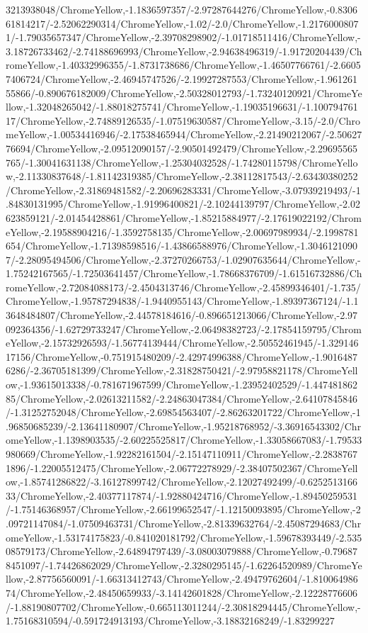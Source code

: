 {\begin{tikzternal}
3213938048/ChromeYellow,-1.1836597357/-2.97287644276/ChromeYellow,-0.830661814217/-2.52062290314/ChromeYellow,-1.02/-2.0/ChromeYellow,-1.21760008071/-1.79035657347/ChromeYellow,-2.39708298902/-1.01718511416/ChromeYellow,-3.18726733462/-2.74188696993/ChromeYellow,-2.94638496319/-1.91720204439/ChromeYellow,-1.40332996355/-1.8731738686/ChromeYellow,-1.46507766761/-2.66057406724/ChromeYellow,-2.46945747526/-2.19927287553/ChromeYellow,-1.96126155866/-0.890676182009/ChromeYellow,-2.50328012793/-1.73240120921/ChromeYellow,-1.32048265042/-1.88018275741/ChromeYellow,-1.19035196631/-1.10079476117/ChromeYellow,-2.74889126535/-1.07519630587/ChromeYellow,-3.15/-2.0/ChromeYellow,-1.00534416946/-2.17538465944/ChromeYellow,-2.21490212067/-2.5062776694/ChromeYellow,-2.09512090157/-2.90501492479/ChromeYellow,-2.29695565765/-1.30041631138/ChromeYellow,-1.25304032528/-1.74280115798/ChromeYellow,-2.11330837648/-1.81142319385/ChromeYellow,-2.38112817543/-2.63430380252/ChromeYellow,-2.31869481582/-2.20696283331/ChromeYellow,-3.07939219493/-1.84830131995/ChromeYellow,-1.91996400821/-2.10244139797/ChromeYellow,-2.02623859121/-2.01454428861/ChromeYellow,-1.85215884977/-2.17619022192/ChromeYellow,-2.19588904216/-1.3592758135/ChromeYellow,-2.00697989934/-2.1998781654/ChromeYellow,-1.71398598516/-1.43866588976/ChromeYellow,-1.30461210907/-2.28095494506/ChromeYellow,-2.37270266753/-1.02907635644/ChromeYellow,-1.75242167565/-1.72503641457/ChromeYellow,-1.78668376709/-1.61516732886/ChromeYellow,-2.72084088173/-2.4504313746/ChromeYellow,-2.45899346401/-1.735/ChromeYellow,-1.95787294838/-1.9440955143/ChromeYellow,-1.89397367124/-1.13648484807/ChromeYellow,-2.44578184616/-0.896651213066/ChromeYellow,-2.97092364356/-1.62729733247/ChromeYellow,-2.06498382723/-2.17854159795/ChromeYellow,-2.15732926593/-1.56774139444/ChromeYellow,-2.50552461945/-1.32914617156/ChromeYellow,-0.751915480209/-2.42974996388/ChromeYellow,-1.90164876286/-2.36705181399/ChromeYellow,-2.31828750421/-2.97958821178/ChromeYellow,-1.93615013338/-0.781671967599/ChromeYellow,-1.23952402529/-1.44748186285/ChromeYellow,-2.02613211582/-2.24863047384/ChromeYellow,-2.64107845846/-1.31252752048/ChromeYellow,-2.69854563407/-2.86263201722/ChromeYellow,-1.96850685239/-2.13641180907/ChromeYellow,-1.95218768952/-3.36916543302/ChromeYellow,-1.1398903535/-2.60225525817/ChromeYellow,-1.33058667083/-1.79533980669/ChromeYellow,-1.92282161504/-2.15147110911/ChromeYellow,-2.28387671896/-1.22005512475/ChromeYellow,-2.06772278929/-2.38407502367/ChromeYellow,-1.85741286822/-3.16127899742/ChromeYellow,-2.12027492499/-0.625251316633/ChromeYellow,-2.40377117874/-1.92880424716/ChromeYellow,-1.89450259531/-1.75146368957/ChromeYellow,-2.66199652547/-1.12150093895/ChromeYellow,-2.09721147084/-1.07509463731/ChromeYellow,-2.81339632764/-2.45087294683/ChromeYellow,-1.53174175823/-0.841020181792/ChromeYellow,-1.59678393449/-2.53508579173/ChromeYellow,-2.64894797439/-3.08003079888/ChromeYellow,-0.796878451097/-1.74426862029/ChromeYellow,-2.3280295145/-1.62264520989/ChromeYellow,-2.87756560091/-1.66313412743/ChromeYellow,-2.49479762604/-1.81006498674/ChromeYellow,-2.48450659933/-3.14142601828/ChromeYellow,-2.12228776606/-1.88190807702/ChromeYellow,-0.665113011244/-2.30818294445/ChromeYellow,-1.75168310594/-0.591724913193/ChromeYellow,-3.18832168249/-1.83299227
\end{tikzternal}}
